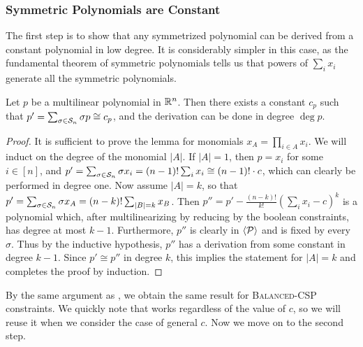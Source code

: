 \subsubsection{Symmetric Polynomials are Constant}
The first step is to show that any symmetrized polynomial can be derived from a constant polynomial in low degree. It is considerably simpler in this case, as the fundamental theorem of symmetric polynomials tells us that powers of $\sum_i x_i$ generate all the symmetric polynomials. 
\begin{lemma}\label{lem:bcsp-symmetric}
Let $p$ be a multilinear polynomial in $\mathbb R^n$. Then there exists a constant $c_p$ such that $p' = \sum_{\sigma \in \mathcal S_n} \sigma p \cong c_p$, and the derivation can be done in degree $\deg p$. 
\end{lemma}
\begin{proof}
It is sufficient to prove the lemma for monomials $x_A = \prod_{i \in A} x_i$. We will induct on the degree of the monomial $|A|$. 
If $|A| = 1$, then $p = x_i$ for some $i \in [n]$, and $p' = \sum_{\sigma \in \mathcal S_n} \sigma x_i = (n-1)!\sum_i x_i \cong (n-1)!\cdot c$, which can clearly be performed in degree one. Now assume $|A| = k$, so that $p' = \sum_{\sigma \in \mathcal S_n} \sigma x_A = (n-k)! \sum_{|B|=k} x_B$. Then $p'' = p' - \frac{(n-k)!}{k!}\left(\sum_i x_i - c\right)^k$ is a polynomial which, after multilinearizing by reducing by the boolean constraints, has degree at most $k-1$. Furthermore, $p''$ is clearly in $\langle \mathcal P \rangle$ and is fixed by every $\sigma$. Thus by the inductive hypothesis, $p''$ has a derivation from some constant in degree $k-1$. Since $p' \cong p''$ in degree $k$, this implies the statement for $|A| = k$ and completes the proof by induction.
\end{proof}
By the same argument as , we obtain the same result for \textsc{Balanced-CSP} constraints. We quickly note that  works regardless of the value of $c$, so we will reuse it when we consider the case of general $c$. Now we move on to the second step.

